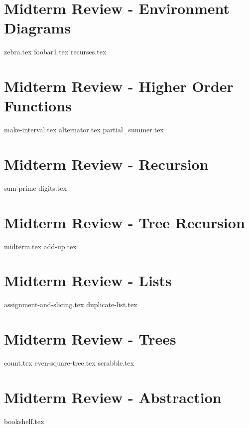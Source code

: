 \documentclass{exam}
\begin{document}
\newpage
\section{Midterm Review - Environment Diagrams}
\begin{questions}
{zebra.tex}
{foobar1.tex}
{recurses.tex}
\end{questions}

\newpage
\section{Midterm Review - Higher Order Functions}
\begin{questions}
{make-interval.tex}
{alternator.tex}
{partial_summer.tex}
\end{questions}

\section{Midterm Review - Recursion}
\begin{questions}
{sum-prime-digits.tex}
\end{questions}

\section{Midterm Review - Tree Recursion}
\begin{questions}
{midterm.tex}
{add-up.tex}
\end{questions}

\newpage
\section{Midterm Review - Lists}
\begin{questions}
{assignment-and-slicing.tex}
{duplicate-list.tex}
\end{questions}

\newpage
\section{Midterm Review - Trees}
\begin{questions}
{count.tex}
{even-square-tree.tex}
{scrabble.tex}
\end{questions}

\newpage
\section{Midterm Review - Abstraction}
{bookshelf.tex}
\end{document}
